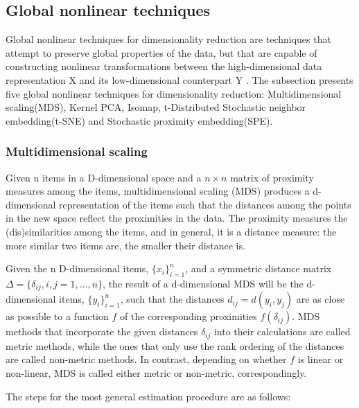 \documentclass[a4paper]{article}
\begin{document}
\subsection{Global nonlinear techniques}
Global nonlinear techniques for dimensionality reduction are
techniques that attempt to preserve global properties of the data, but that are capable of constructing nonlinear transformations between the
high-dimensional data representation X and its low-dimensional
counterpart Y . The subsection presents five global nonlinear
techniques for dimensionality reduction: Multidimensional scaling(MDS),
Kernel PCA, Isomap, t-Distributed Stochastic neighbor embedding(t-SNE) and Stochastic proximity embedding(SPE).

\subsubsection{Multidimensional scaling}

Given n items in a D-dimensional space and a $n \times n$ matrix of
proximity measures among the items, multidimensional scaling (MDS) produces a d-dimensional representation of the items such that the
distances among the points in the new space reflect the proximities in
the data. The proximity measures the (dis)similarities among the items, and in general, it is a distance measure: the more similar two
items are, the smaller their distance is.

Given the n D-dimensional items, $\{x_i\}_{i=1}^n$, and a symmetric
distance matrix $\Delta = \{\delta_{ij}, i,j = 1,\ldots,n\}$, the result of a d-dimensional MDS
will be the d-dimensional items, $\{y_i\}_{i=1}^n$, such that the
distances $d_{ij}=d(y_i,y_j)$ are as close as possible to a function
$f$ of the corresponding proximities $f(\delta_{ij})$. MDS methods that incorporate the given distances $\delta_{ij}$ into their calculations are called metric
methods, while the ones that only use the rank ordering of the
distances are called non-metric methods. In contrast, depending on whether $f$
is linear or non-linear, MDS is called either metric or non-metric, correspondingly.

The steps for the most general estimation procedure are as follows:
\end{document}
